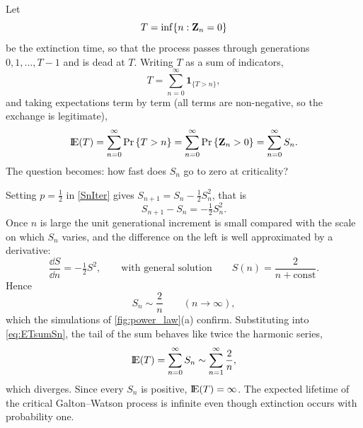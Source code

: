 Let
\begin{equation*}
T = \inf\{n : {\bf Z}_n = 0\}
\end{equation*}
be the extinction time, so that the process passes through generations
$0,1,\dots,T-1$ and is dead at $T$. Writing $T$ as a sum of indicators,
\begin{equation*}
T = \sum_{n=0}^{\infty}\mathbf{1}_{\{T>n\}},
\end{equation*}
and taking expectations term by term (all terms are non-negative, so the exchange is
legitimate),
\begin{equation}
\label{eq:ETsumSn}
{\rm I}\!{\rm E}(T) = \sum_{n=0}^{\infty}{\text{Pr}\left\{T>n\right\}} = \sum_{n=0}^{\infty}{\text{Pr}\left\{{\bf Z}_n>0\right\}} = \sum_{n=0}^{\infty}S_n .
\end{equation}
The question becomes: how fast does $S_n$ go to zero at criticality?

Setting $p=\tfrac12$ in \cref{SnIter} gives $S_{n+1} = S_n - \tfrac12 S_n^2$, that is
\begin{equation*}
S_{n+1}-S_n = -\tfrac12 S_n^2 .
\end{equation*}
Once $n$ is large the unit generational increment is small compared with the scale on
which $S_n$ varies, and the difference on the left is well approximated by a derivative:
\begin{equation*}
\frac{\dd S}{\dd n} = -\tfrac12 S^2,
\qquad\text{with general solution}\qquad
S(n) = \frac{2}{n + \text{const}}.
\end{equation*}
Hence
\begin{equation}
\label{twoovrn_sn}
S_n \sim \frac{2}{n}\qquad (n\to\infty),
\end{equation}
which the simulations of \cref{fig:power_law}(a) confirm. Substituting into
\cref{eq:ETsumSn}, the tail of the sum behaves like twice the harmonic series,
\begin{equation*}
{\rm I}\!{\rm E}(T) = \sum_{n=0}^{\infty}S_n \sim \sum_{n=1}^{\infty}\frac{2}{n},
\end{equation*}
which diverges. Since every $S_n$ is positive, ${\rm I}\!{\rm E}(T)=\infty$. The expected lifetime
of the critical Galton--Watson process is infinite even though extinction occurs with
probability one.

